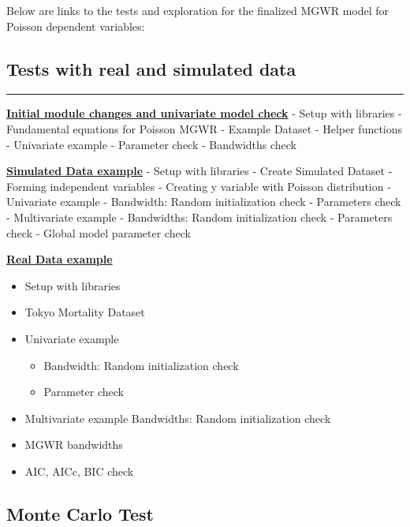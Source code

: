 \documentclass[11pt]{article}
\providecommand{\tightlist}{%
      \setlength{\itemsep}{0pt}\setlength{\parskip}{0pt}}
\begin{document}
    Below are links to the tests and exploration for the finalized MGWR
model for Poisson dependent variables:

    \subsection{Tests with real and simulated
data}\label{tests-with-real-and-simulated-data}

\begin{center}\rule{0.5\linewidth}{\linethickness}\end{center}

    \textbf{\href{http://mehak-sachdeva.github.io/MGWR_book/Html/Poisson_MGWR_univariate_check}{Initial
module changes and univariate model check}} - Setup with libraries -
Fundamental equations for Poisson MGWR - Example Dataset - Helper
functions - Univariate example - Parameter check - Bandwidths check

\textbf{\href{http://mehak-sachdeva.github.io/MGWR_book/Html/Simulated_data_example_Poisson-MGWR}{Simulated
Data example}} - Setup with libraries - Create Simulated Dataset -
Forming independent variables - Creating y variable with Poisson
distribution - Univariate example - Bandwidth: Random initialization
check - Parameters check - Multivariate example - Bandwidths: Random
initialization check - Parameters check - Global model parameter check

\textbf{\href{http://mehak-sachdeva.github.io/MGWR_book/Html/Real_data_example_Poisson-MGWR}{Real
Data example}}

\begin{itemize}
\tightlist
\item
  Setup with libraries
\item
  Tokyo Mortality Dataset
\item
  Univariate example

  \begin{itemize}
  \tightlist
  \item
    Bandwidth: Random initialization check
  \item
    Parameter check
  \end{itemize}
\item
  Multivariate example Bandwidths: Random initialization check
\item
  MGWR bandwidths
\item
  AIC, AICc, BIC check
\end{itemize}

    \subsection{Monte Carlo Test}\label{monte-carlo-test}
\end{document}
